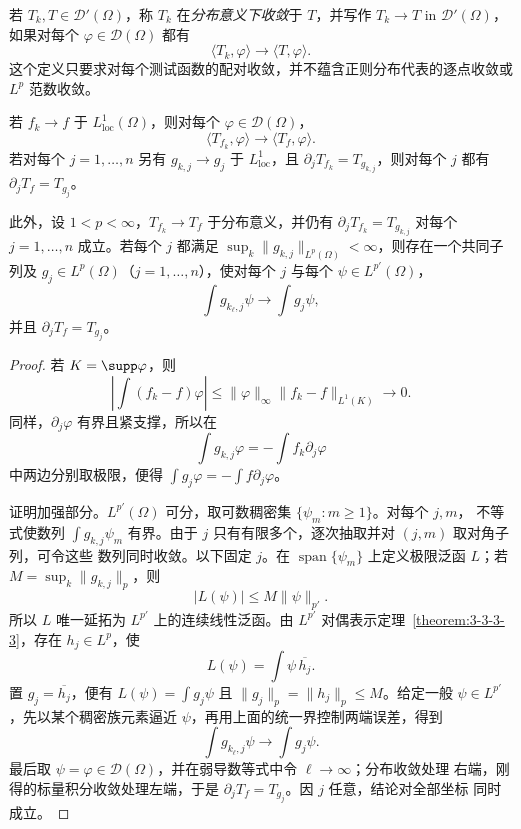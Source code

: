 若 $T_k,T\in\mathcal D'(\Omega)$，称 $T_k$ 在\emph{分布意义下收敛}于 $T$，并写作
$T_k\to T$ in $\mathcal D'(\Omega)$，如果对每个 $\varphi\in\mathcal D(\Omega)$ 都有
\[
 \langle T_k,\varphi\rangle\longrightarrow
 \langle T,\varphi\rangle.
\]
这个定义只要求对每个测试函数的配对收敛，并不蕴含正则分布代表的逐点收敛或 $L^p$ 范数收敛。

\begin{theorem}[分布收敛与弱导数闭性]\label{theorem:4-3-2-4}
若 $f_k\to f$ 于 $L^1_{\mathrm{loc}}(\Omega)$，则对每个
$\varphi\in\mathcal D(\Omega)$，
\[
 \langle T_{f_k},\varphi\rangle\longrightarrow\langle T_f,\varphi\rangle.
\]
若对每个 $j=1,\ldots,n$ 另有 $g_{k,j}\to g_j$ 于 $L^1_{\mathrm{loc}}$，且
$\partial_jT_{f_k}=T_{g_{k,j}}$，则对每个 $j$ 都有 $\partial_jT_f=T_{g_j}$。

此外，设 $1<p<\infty$，$T_{f_k}\to T_f$ 于分布意义，并仍有
$\partial_jT_{f_k}=T_{g_{k,j}}$ 对每个 $j=1,\ldots,n$ 成立。若每个 $j$ 都满足
$\sup_k\|g_{k,j}\|_{L^p(\Omega)}<\infty$，则存在一个共同子列及
$g_j\in L^p(\Omega)$（$j=1,\ldots,n$），使对每个 $j$ 与每个
$\psi\in L^{p'}(\Omega)$，
\[
 \int g_{k_\ell,j}\psi\longrightarrow\int g_j\psi,
\]
并且 $\partial_jT_f=T_{g_j}$。
\end{theorem}

\begin{proof}
若 $K=\supp\varphi$，则
\[
 \left|\int(f_k-f)\varphi\right|
 \leq\|\varphi\|_\infty\|f_k-f\|_{L^1(K)}\longrightarrow0.
\]
同样，$\partial_j\varphi$ 有界且紧支撑，所以在
\[
 \int g_{k,j}\varphi=-\int f_k\partial_j\varphi
\]
中两边分别取极限，便得
$\int g_j\varphi=-\int f\partial_j\varphi$。

证明加强部分。$L^{p'}(\Omega)$ 可分，取可数稠密集
$\{\psi_m:m\geq1\}$。对每个 $j,m$，\Holder{} 不等式使数列
$\int g_{k,j}\psi_m$ 有界。由于 $j$ 只有有限多个，逐次抽取并对 $(j,m)$ 取对角子列，可令这些
数列同时收敛。以下固定 $j$。在
$\operatorname{span}\{\psi_m\}$ 上定义极限泛函 $L$；若
$M=\sup_k\|g_{k,j}\|_p$，则
\[
 |L(\psi)|\leq M\|\psi\|_{p'}.
\]
所以 $L$ 唯一延拓为 $L^{p'}$ 上的连续线性泛函。由
$L^{p'}$ 对偶表示定理~\ref{theorem:3-3-3-3}，存在 $h_j\in L^p$，使
\[
 L(\psi)=\int\psi\,\overline{h_j}.
\]
置 $g_j=\overline{h_j}$，便有 $L(\psi)=\int g_j\psi$ 且
$\|g_j\|_p=\|h_j\|_p\leq M$。给定一般
$\psi\in L^{p'}$，先以某个稠密族元素逼近 $\psi$，再用上面的统一界控制两端误差，得到
\[
 \int g_{k_\ell,j}\psi\to\int g_j\psi.
\]
最后取 $\psi=\varphi\in\mathcal D(\Omega)$，并在弱导数等式中令 $\ell\to\infty$；分布收敛处理
右端，刚得的标量积分收敛处理左端，于是 $\partial_jT_f=T_{g_j}$。因 $j$ 任意，结论对全部坐标
同时成立。
\end{proof}

